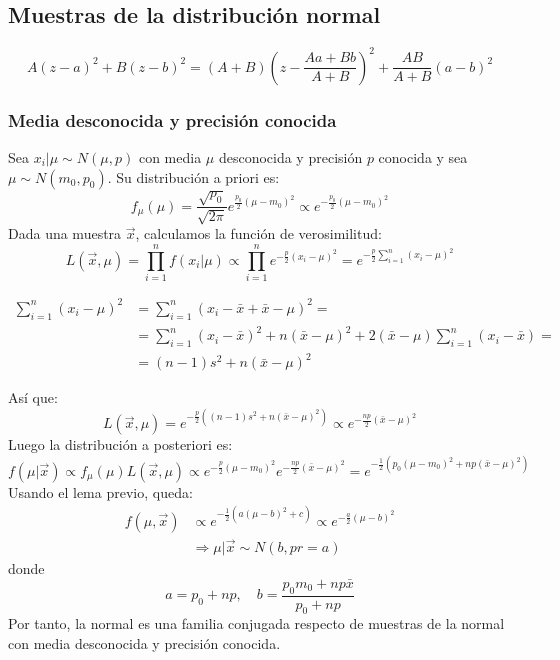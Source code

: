 \subsection*{Muestras de la distribución normal}
\begin{lemma}
    $$A(z-a)^2 + B(z-b)^2 = (A+B)\left(z - \frac{Aa+Bb}{A+B}\right)^2 + \frac{AB}{A+B}(a-b)^2$$
\end{lemma}

\subsubsection*{Media desconocida y precisión conocida}
Sea $x_i|\mu \sim N(\mu, p)$ con media $\mu$ desconocida y precisión $p$ conocida y sea $\mu \sim N(m_0, p_0)$.
Su distribución a priori es:
$$f_\mu(\mu) = \frac{\sqrt{p_0}}{\sqrt{2\pi}} e^{\frac{p_0}{2}(\mu-m_0)^2} \propto e^{-\frac{p_0}{2}(\mu-m_0)^2}$$
Dada una muestra $\vec{x}$, calculamos la función de verosimilitud:
$$L(\vec{x}, \mu) = \prod_{i=1}^n f(x_i|\mu) \propto \prod_{i=1}^n e^{-\frac{p}{2}(x_i-\mu)^2} = e^{-\frac{p}{2}\sum_{i=1}^n (x_i-\mu)^2}$$

\begin{note}
    \begin{align*}
        \sum_{i=1}^n (x_i-\mu)^2 & = \sum_{i=1}^n (x_i-\bar{x}+\bar{x}-\mu)^2 =                                                   \\
                                 & = \sum_{i=1}^n (x_i-\bar{x})^2 + n(\bar{x}-\mu)^2 + 2(\bar{x}-\mu)\sum_{i=1}^n (x_i-\bar{x}) = \\
                                 & = (n-1)s^2 + n(\bar{x}-\mu)^2
    \end{align*}
\end{note}

Así que:
$$L(\vec{x}, \mu) = e^{-\frac{p}{2}((n-1)s^2+n(\bar{x}-\mu)^2)} \propto e^{-\frac{np}{2}(\bar{x}-\mu)^2}$$
Luego la distribución a posteriori es:
$$f(\mu|\vec{x}) \propto f_\mu(\mu)L(\vec{x}, \mu) \propto e^{-\frac{p}{2}(\mu-m_0)^2}e^{-\frac{np}{2}(\bar{x}-\mu)^2} = e^{-\frac{1}{2}(p_0(\mu-m_0)^2+np(\bar{x}-\mu)^2)}$$
Usando el lema previo, queda:
\begin{align*}
    f(\mu, \vec{x}) & \propto e^{-\frac{1}{2}(a(\mu-b)^2+c)} \propto e^{-\frac{a}{2}(\mu-b)^2} \\
                    & \Rightarrow \mu|\vec{x} \sim N(b, pr = a)
\end{align*}
donde
$$a = p_0+np, \quad b = \frac{p_0m_0+np\bar{x}}{p_0+np}$$
Por tanto, la normal es una familia conjugada respecto de muestras de la normal con media desconocida y precisión conocida.

